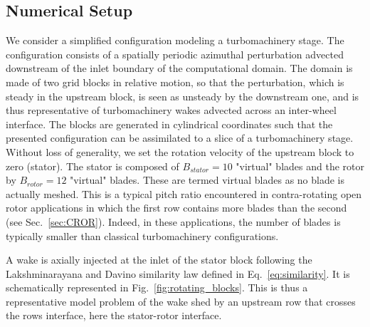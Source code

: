 \subsection{Numerical Setup}
We consider a simplified configuration modeling a turbomachinery 
stage. The configuration consists of a spatially 
periodic azimuthal perturbation advected downstream 
of the inlet boundary of the computational domain. 
The domain is made of two grid blocks in relative 
motion, so that the perturbation, which is steady 
in the upstream block, is seen as unsteady by the 
downstream one, and is thus representative of 
turbomachinery wakes advected across an inter-wheel interface.
The blocks are generated in cylindrical
coordinates such that the presented configuration
can be assimilated to a slice of 
a turbomachinery stage.
Without loss of generality, 
we set the rotation velocity of the upstream block to zero (stator). 
The stator is composed of $B_{stator} = 10$
"virtual" blades and the rotor by $B_{rotor} = 12$ "virtual" blades.
These are termed virtual blades as no blade is actually meshed.
This is a typical pitch ratio encountered 
in contra-rotating open rotor applications in which 
the first row contains more blades 
than the second (see Sec.~\ref{sec:CROR}). Indeed, in
these applications, the number
of blades is typically smaller than classical
turbomachinery configurations. %

A wake is axially injected at the inlet of the
stator block following the Lakshminarayana and
Davino
similarity law defined in Eq.~\eqref{eq:similarity}.
It is schematically represented in 
Fig.~\ref{fig:rotating_blocks}.
This is thus a representative model problem of the wake shed
by an upstream row that crosses the rows interface, 
here the stator-rotor interface.

